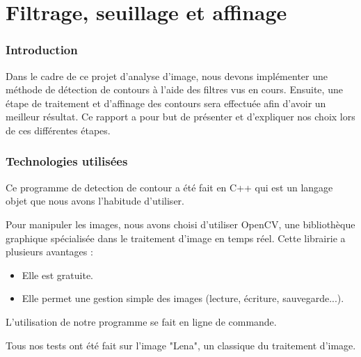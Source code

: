 \documentclass[11pt]{article}
\author{\fontsize{14}{14}{Aurélien CHEMIER 10908892 et Romane LHOMME 11006689}}
\title{\fontsize{16}{16}{{\bf Analyse, aquisition et traitement d’image \\ TP1}}}
\date{\fontsize{11}{11}{\today}}
\begin{document}
\thispagestyle{empty}
\maketitle

\newpage
\tableofcontents
\newpage

\part{Filtrage, seuillage et affinage}

\section{Introduction}

	Dans le cadre de ce projet d’analyse d’image, nous devons implémenter une méthode de détection de contours à l’aide des filtres vus en cours. 
	Ensuite, une étape de traitement et d'affinage des contours  sera effectuée afin d'avoir un meilleur résultat.
	Ce rapport a pour but de présenter et d'expliquer nos choix lors de ces différentes étapes.

	\section{Technologies utilisées}

	Ce programme de detection de contour a été fait en C++ qui est un langage objet que nous avons l'habitude d'utiliser.

	Pour manipuler les images, nous avons choisi d'utiliser OpenCV, une bibliothèque graphique spécialisée dans le traitement d'image en temps réel.
	Cette librairie a plusieurs avantages :
	\begin{itemize}
		\item Elle est gratuite.
		\item Elle permet une gestion simple des images (lecture, écriture, sauvegarde...).
	\end{itemize}

	L'utilisation de notre programme se fait en ligne de commande.

	Tous nos tests ont été fait sur l'image "Lena", un classique du traitement d'image.
\end{document}
